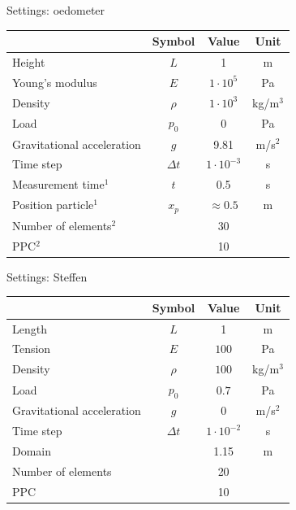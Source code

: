 \documentclass[mathserif,professionalfont,hyperref={pdfpagelabels=false}]{beamer}
\begin{document}
\begin{frame}{Settings: oedometer}
\begin{table}[h]
\centering
\begin{tabular}{l | c c c}
 & Symbol & Value & Unit \\
\hline
Height & $L$ & 1 & m\\
Young's modulus& $E$ & $ 1 \cdot10^5$ & Pa\\
Density & $\rho$ & $1 \cdot10^3$ & kg/m$^3$\\
Load & $p_0$ & $0$ & Pa\\
Gravitational acceleration & $g$ & 9.81 & m/s$^2$\\ 
Time step & $\Delta t$ &$ 1 \cdot10^{-3}$ & s\\
Measurement time$^1$ & $t$ & 0.5 & s\\
Position particle$^1$ & $x_p$ & $\approx 0.5$ & m\\
Number of elements$^2$ & & 30& \\
PPC$^2$ & & 10 & \\
\end{tabular}
\end{table}
\end{frame}

\begin{frame}{Settings: Steffen}
\begin{table}[h]
\centering
\begin{tabular}{l | c c c}
 & Symbol & Value & Unit \\
\hline
Length& $L$ & 1 & m\\
Tension& $E$ & $ 100$ & Pa\\
Density & $\rho$ & $100$ & kg/m$^3$\\
Load & $p_0$ & $0.7$ & Pa\\
Gravitational acceleration & $g$ & 0  & m/s$^2$\\ 
Time step & $\Delta t$ &$ 1 \cdot10^{-2}$ & s\\
Domain & & 1.15 & m \\
Number of elements & & 20& \\
PPC & & 10 & \\
\end{tabular}
\end{table}
\end{frame}
\end{document}
